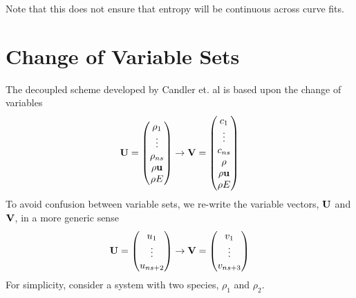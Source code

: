 Note that this does not ensure that entropy will be continuous across curve
fits.

\section{Change of Variable Sets}
\label{change-of-var-section}

The decoupled scheme developed by Candler et. al\cite{candler} is based upon the
change of variables
\begin{equation}
  \mathbf U = \begin{pmatrix}
    \rho_1 \\
    \vdots \\
    \rho_{ns} \\
    \rho \mathbf u \\
    \rho E
  \end{pmatrix}
  \rightarrow
  \mathbf V = \begin{pmatrix}
    c_1 \\
    \vdots \\
    c_{ns} \\
    \rho \\
    \rho \mathbf u \\
    \rho E
  \end{pmatrix}
  \label{var-sets}
\end{equation}
To avoid confusion between variable sets, we re-write the variable vectors,
$\mathbf U$ and $\mathbf V$, in a more generic sense
\begin{equation}
  \mathbf U = \begin{pmatrix}
    u_1 \\
    \vdots \\
    u_{ns + 2}
  \end{pmatrix}
  \rightarrow
  \mathbf V = \begin{pmatrix}
    v_1 \\
    \vdots \\
    v_{ns + 3}
  \end{pmatrix}
  \label{generic-var-sets}
\end{equation}
For simplicity, consider a system with two species, $\rho_1$ and $\rho_2$.
